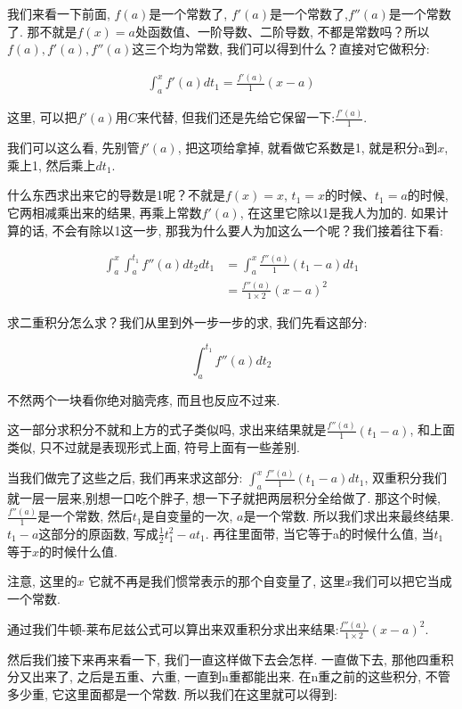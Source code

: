 我们来看一下前面, $f(a)$是一个常数了, $f'(a)$是一个常数了,$f''(a)$是一个常数了. 那不就是$f(x) = a$处函数值、一阶导数、二阶导数, 不都是常数吗？所以$f(a), f'(a), f''(a)$这三个均为常数, 我们可以得到什么？直接对它做积分: 

\begin{align*}
\int_a^xf'(a)dt_1 = \frac{f'(a)}{1}(x-a)
\end{align*}

这里, 可以把$f'(a)$用$C$来代替, 但我们还是先给它保留一下:$\frac{f'(a)}{1}$. 

我们可以这么看, 先别管$f'(a)$, 把这项给拿掉, 就看做它系数是1, 就是积分a到$x$, 乘上1,  然后乘上$dt_1$. 

什么东西求出来它的导数是1呢？不就是$f(x) = x$, $t_1 = x$的时候、$t_1 = a$的时候, 它两相减乘出来的结果, 再乘上常数$f'(a)$, 在这里它除以1是我人为加的. 如果计算的话, 不会有除以1这一步, 那我为什么要人为加这么一个呢？我们接着往下看:

\begin{align*}
  \int_a^x\int_a^{t_1}f''(a)dt_2dt_1 & = \int_a^x \frac{f''(a)}{1}(t_1 - a)dt_1 \\
  & = \frac{f''(a)}{1 \times 2}(x-a)^2
\end{align*}

求二重积分怎么求？我们从里到外一步一步的求, 我们先看这部分: 

\[\int_a^{t_1}f''(a)dt_2\]

不然两个一块看你绝对脑壳疼, 而且也反应不过来. 

这一部分求积分不就和上方的式子类似吗, 求出来结果就是$\frac{f''(a)}{1}(t_1 - a)$, 和上面类似, 只不过就是表现形式上面, 符号上面有一些差别. 

当我们做完了这些之后, 我们再来求这部分: $\int_a^x \frac{f''(a)}{1}(t_1 - a)dt_1$, 双重积分我们就一层一层来,别想一口吃个胖子, 想一下子就把两层积分全给做了. 那这个时候, $\frac{f''(a)}{1}$是一个常数, 然后$t_1$是自变量的一次, $a$是一个常数. 所以我们求出来最终结果. $t_1-a$这部分的原函数, 写成$\frac{1}{2}t_1^2 - at_1$. 再往里面带, 当它等于a的时候什么值, 当$t_1$等于$x$的时候什么值. 

注意, 这里的$x$ 它就不再是我们惯常表示的那个自变量了, 这里$x$我们可以把它当成一个常数. 

通过我们牛顿-莱布尼兹公式可以算出来双重积分求出来结果:$\frac{f''(a)}{1 \times 2}(x-a)^2$. 

然后我们接下来再来看一下, 我们一直这样做下去会怎样. 一直做下去, 那他四重积分又出来了, 之后是五重、六重, 一直到n重都能出来. 在n重之前的这些积分, 不管多少重, 它这里面都是一个常数. 所以我们在这里就可以得到: 

